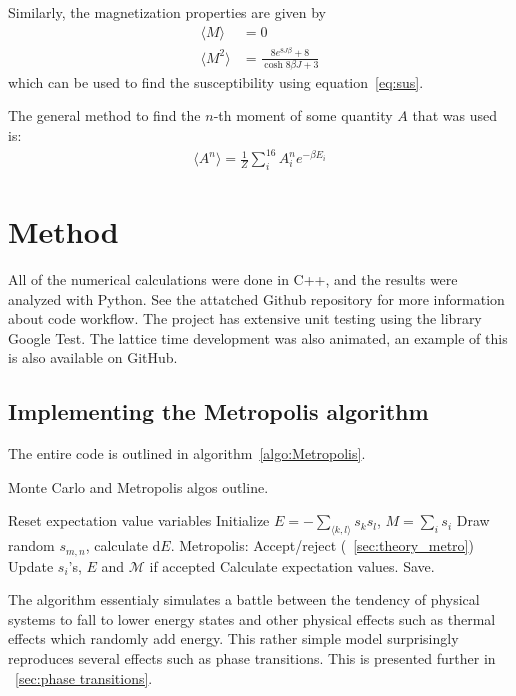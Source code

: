 \documentclass[aps,reprint]{revtex4-1}
\newcommand{\mean}[1]{\langle #1 \rangle}
\begin{document}
Similarly, the magnetization properties are given by
\begin{align*}
  \mean{M} &= 0 \\
  \mean{M^2} &= \frac{8e^{8 J \beta} + 8}{\cosh{8\beta J} + 3}
\end{align*}
which can be used to find the susceptibility using equation~\ref{eq:sus}.

The general method to find the $n$-th moment of some quantity $A$ that was
used is:
\begin{align*}
  \mean{A^n} = \frac{1}{Z} \sum_i^{16} A_i^n e^{-\beta E_i}
\end{align*}

\section{Method} \label{sec:method}
All of the numerical calculations were done in C++, and the results were analyzed
with Python. See the attatched Github repository for more information about code workflow.
The project has extensive unit testing using the library Google Test. The lattice time
development was also animated, an example of this is also available on GitHub.
\subsection{Implementing the Metropolis algorithm}
The entire code is outlined in algorithm~\ref{algo:Metropolis}.
\begin{algorithm}[H]
  \caption{Monte Carlo and Metropolis algos outline.}
  \label{algo:Metropolis}
   \begin{algorithmic}[1]
        \State Reset expectation value variables
        \State Initialize $E = -\sum_{\mean{k,l}}s_k s_l$, $M = \sum_i s_i$
            \State Draw random $s_{m,n}$, calculate d$E$.
            \State Metropolis: Accept/reject (~\ref{sec:theory_metro})
            \State Update $s_i$'s, $E$ and $\mathcal M$ if accepted
          \EndFor
        \EndFor
        \State Calculate expectation values. Save.
     \EndFor
   \end{algorithmic}
\end{algorithm}
The algorithm essentialy simulates a battle between the tendency of physical systems
to fall to lower energy states and other physical effects such as thermal
effects which randomly add energy. This rather simple model surprisingly
reproduces several effects such as phase transitions. This is presented further in
~\ref{sec:phase transitions}.
\end{document}
